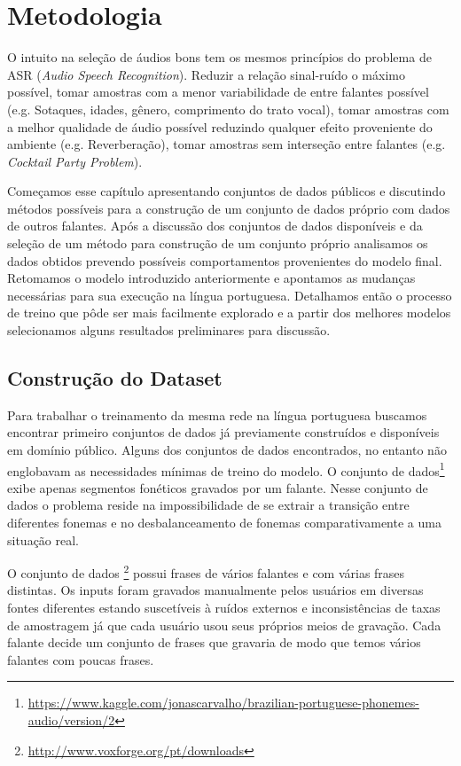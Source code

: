 \chapter{Metodologia}
\label{cap:metodologia}

O intuito na seleção de áudios bons tem os mesmos princípios do problema de ASR (\textit{Audio Speech Recognition}). Reduzir a relação sinal-ruído o máximo possível, tomar amostras com a menor variabilidade de entre falantes possível (e.g. Sotaques, idades, gênero, comprimento do trato vocal), tomar amostras com a melhor qualidade de áudio possível reduzindo qualquer efeito proveniente do ambiente (e.g. Reverberação), tomar amostras sem interseção entre falantes (e.g. \textit{Cocktail Party Problem}).

Começamos esse capítulo apresentando conjuntos de dados públicos e discutindo métodos possíveis para a construção de um conjunto de dados próprio com dados de outros falantes. Após a discussão dos conjuntos de dados disponíveis e da seleção de um método para construção de um conjunto próprio analisamos os dados obtidos prevendo possíveis comportamentos provenientes do modelo final. Retomamos o modelo introduzido anteriormente e apontamos as mudanças necessárias para sua execução na língua portuguesa. Detalhamos então o processo de treino que pôde ser mais facilmente explorado e a partir dos melhores modelos selecionamos alguns resultados preliminares para discussão.


\section{Construção do Dataset}
Para trabalhar o treinamento da mesma rede na língua portuguesa buscamos encontrar primeiro conjuntos de dados já previamente construídos e disponíveis em domínio público. Alguns dos conjuntos de dados encontrados, no entanto não englobavam as necessidades mínimas de treino do modelo. O conjunto de dados\footnote{\url{https://www.kaggle.com/jonascarvalho/brazilian-portuguese-phonemes-audio/version/2}} exibe apenas segmentos fonéticos gravados por um falante. Nesse conjunto de dados o problema reside na impossibilidade de se extrair a transição entre diferentes fonemas e no desbalanceamento de fonemas comparativamente a uma situação real. 

O conjunto de dados \footnote{\url{http://www.voxforge.org/pt/downloads}} possui frases de vários falantes e com várias frases distintas. Os inputs foram gravados manualmente pelos usuários em diversas fontes diferentes estando suscetíveis à ruídos externos e inconsistências de taxas de amostragem já que cada usuário usou seus próprios meios de gravação. Cada falante decide um conjunto de frases que gravaria de modo que temos vários falantes com poucas frases.

